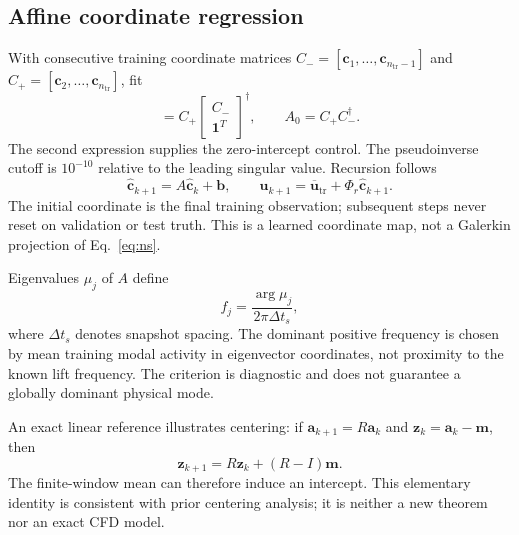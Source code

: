 \documentclass[11pt,a4paper]{article}
\begin{document}
\subsection{Affine coordinate regression}
With consecutive training coordinate matrices $C_-=[\bm c_1,\ldots,\bm c_{n_{\mathrm{tr}}-1}]$ and $C_+=[\bm c_2,\ldots,\bm c_{n_{\mathrm{tr}}}]$, fit
\begin{equation}
 [A\;\bm b]=C_+\begin{bmatrix}C_-\\\bm1^T\end{bmatrix}^{\dagger},\qquad
 A_0=C_+C_-^{\dagger}.\label{eq:affine}
\end{equation}
The second expression supplies the zero-intercept control. The pseudoinverse cutoff is $10^{-10}$ relative to the leading singular value. Recursion follows
\begin{equation}
 \widehat{\bm c}_{k+1}=A\widehat{\bm c}_k+\bm b,\qquad
 \widehat{\bm u}_{k+1}=\overline{\bm u}_{\mathrm{tr}}+\Phi_r\widehat{\bm c}_{k+1}.\label{eq:forecast}
\end{equation}
The initial coordinate is the final training observation; subsequent steps never reset on validation or test truth. This is a learned coordinate map, not a Galerkin projection of Eq.~\eqref{eq:ns}.

Eigenvalues $\mu_j$ of $A$ define
\begin{equation}
 f_j=\frac{\arg\mu_j}{2\pi\Delta t_s},\label{eq:frequency}
\end{equation}
where $\Delta t_s$ denotes snapshot spacing. The dominant positive frequency is chosen by mean training modal activity in eigenvector coordinates, not proximity to the known lift frequency. The criterion is diagnostic and does not guarantee a globally dominant physical mode.

An exact linear reference illustrates centering: if $\bm a_{k+1}=R\bm a_k$ and $\bm z_k=\bm a_k-\bm m$, then
\begin{equation}
 \bm z_{k+1}=R\bm z_k+(R-I)\bm m.\label{eq:shift}
\end{equation}
The finite-window mean can therefore induce an intercept. This elementary identity is consistent with prior centering analysis\cite{hirsh}; it is neither a new theorem nor an exact CFD model.
\end{document}
